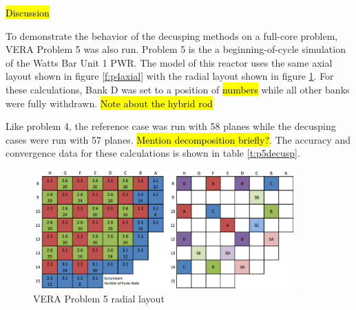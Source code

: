 \begin{table}
\centering
\caption{VERA Problem 4 Decusping Results}\label{t:p4decusp}
\end{table}

\hl{Discussion}

To demonstrate the behavior of the decusping methods on a full-core problem, VERA Problem 5 was also run.  Problem 5 is the a beginning-of-cycle simulation of the Watts Bar Unit 1 PWR.  The model of this reactor uses the same axial layout shown in figure \ref{f:p4axial} with the radial layout shown in figure \ref{f:p5radial}.  For these calculations, Bank D was set to a position of \hl{numbers} while all other banks were fully withdrawn.  \hl{Note about the hybrid rod}

Like problem 4, the reference case was run with 58 planes while the decusping cases were run with 57 planes.  \hl{Mention decomposition briefly?}.  The accuracy and convergence data for these calculations is shown in table \ref{t:p5decusp}.

\begin{figure}
\centering
\includegraphics[width=0.9\textwidth]{figs/WB1-cycle1-layout.png}
\caption{VERA Problem 5 radial layout}\label{f:p5radial}
\end{figure}

